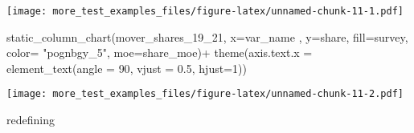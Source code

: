 \documentclass[
]{article}
\newenvironment{Shaded}{\begin{snugshade}}{\end{snugshade}}
\newcommand{\AttributeTok}[1]{\textcolor[rgb]{0.77,0.63,0.00}{#1}}
\newcommand{\DecValTok}[1]{\textcolor[rgb]{0.00,0.00,0.81}{#1}}
\newcommand{\FloatTok}[1]{\textcolor[rgb]{0.00,0.00,0.81}{#1}}
\newcommand{\FunctionTok}[1]{\textcolor[rgb]{0.00,0.00,0.00}{#1}}
\newcommand{\NormalTok}[1]{#1}
\newcommand{\SpecialCharTok}[1]{\textcolor[rgb]{0.00,0.00,0.00}{#1}}
\newcommand{\StringTok}[1]{\textcolor[rgb]{0.31,0.60,0.02}{#1}}
\begin{document}
\texttt{[image: more\_test\_examples\_files/figure-latex/unnamed-chunk-11-1.pdf]}

\begin{Shaded}
\begin{Highlighting}[]
\FunctionTok{static\_column\_chart}\NormalTok{(mover\_shares\_19\_21, }\AttributeTok{x=}\StringTok{\textquotesingle{}var\_name\textquotesingle{}}\NormalTok{ , }\AttributeTok{y=}\StringTok{\textquotesingle{}share\textquotesingle{}}\NormalTok{, }\AttributeTok{fill=}\StringTok{\textquotesingle{}survey\textquotesingle{}}\NormalTok{, }\AttributeTok{color=} \StringTok{"pognbgy\_5"}\NormalTok{, }\AttributeTok{moe=}\StringTok{\textquotesingle{}share\_moe\textquotesingle{}}\NormalTok{)}\SpecialCharTok{+} \FunctionTok{theme}\NormalTok{(}\AttributeTok{axis.text.x =} \FunctionTok{element\_text}\NormalTok{(}\AttributeTok{angle =} \DecValTok{90}\NormalTok{, }\AttributeTok{vjust =} \FloatTok{0.5}\NormalTok{, }\AttributeTok{hjust=}\DecValTok{1}\NormalTok{))}
\end{Highlighting}
\end{Shaded}

\texttt{[image: more\_test\_examples\_files/figure-latex/unnamed-chunk-11-2.pdf]}

redefining
\end{document}
